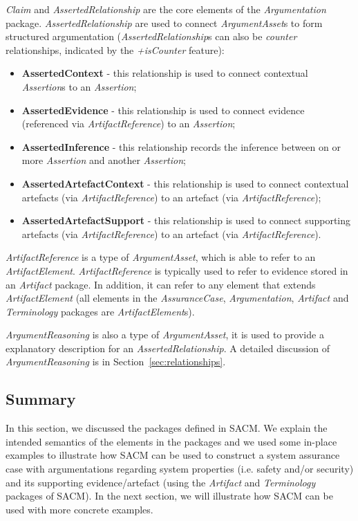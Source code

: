 \textit{Claim} and \textit{AssertedRelationship} are the core elements of the \textit{Argumentation} package.
\textit{AssertedRelationship} are used to connect \textit{ArgumentAsset}s to form structured argumentation (\textit{AssertedRelationship}s can also be \textit{counter} relationships, indicated by the \textit{+isCounter} feature):

\begin{itemize}
	\item \textbf{AssertedContext} - this relationship is used to connect contextual \textit{Assertion}s to an \textit{Assertion};
	\item \textbf{AssertedEvidence} - this relationship is used to connect evidence (referenced via \textit{ArtifactReference}) to an \textit{Assertion};
	\item \textbf{AssertedInference} - this relationship records the inference between on or more \textit{Assertion} and another \textit{Assertion};
	\item \textbf{AssertedArtefactContext} - this relationship is used to connect contextual artefacts (via \textit{ArtifactReference}) to an artefact (via \textit{ArtifactReference});
	\item \textbf{AssertedArtefactSupport} - this relationship is used to connect supporting artefacts (via \textit{ArtifactReference}) to an artefact (via \textit{ArtifactReference}).
\end{itemize}

\textit{ArtifactReference} is a type of \textit{ArgumentAsset}, which is able to refer to an \textit{ArtifactElement}.
\textit{ArtifactReference} is typically used to refer to evidence stored in an \textit{Artifact} package. 
In addition, it can refer to any element that extends \textit{ArtifactElement} (all elements in the \textit{AssuranceCase}, \textit{Argumentation}, \textit{Artifact} and \textit{Terminology} packages are \textit{ArtifactElement}s).

\textit{ArgumentReasoning} is also a type of \textit{ArgumentAsset}, it is used to provide a explanatory description for an \textit{AssertedRelationship}. 
A detailed discussion of \textit{ArgumentReasoning} is in Section~\ref{sec:relationships}.

\subsection{Summary}
In this section, we discussed the packages defined in SACM. We explain the intended semantics of the elements in the packages and we used some in-place examples to illustrate how SACM can be used to construct a system assurance case with argumentations regarding system properties (i.e. safety and/or security) and its supporting evidence/artefact (using the \textit{Artifact} and \textit{Terminology} packages of SACM). 
In the next section, we will illustrate how SACM can be used with more concrete examples.

